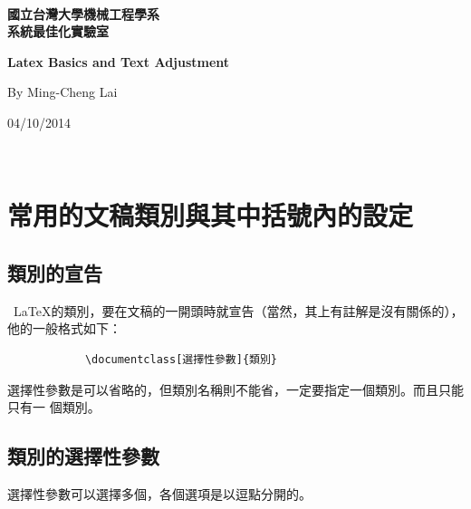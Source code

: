 \documentclass[12pt,a4paper]{report}
\begin{document}
\begin{CJK}{UTF8}{bkai}
\thispagestyle{empty}
\begin{center}
       ~\\
        \vspace{6.8cm}

        \textbf{\Huge
國立台灣大學機械工程學系 \\
系統最佳化實驗室
}
        \vspace{3cm}

        \textbf{\Huge
	Latex Basics and Text Adjustment
        }
        \vspace{6cm}

        {\large
        By  Ming-Cheng Lai
        }
        \vspace{4cm}

        {\large
            04/10/2014
        }
    \end{center}

\newpage



\thispagestyle{empty}
~
\newpage
\clearpage
\setcounter{page}{1}
\chapter{常用的文稿類別與其中括號內的設定}

\section{類別的宣告}
\noindent\  
\LaTeX 的類別，要在文稿的一開頭時就宣告（當然，其上有註解是沒有關係的），他的一般格式如下：

		\begin{framed}
			\begin{verbatim}
			\documentclass[選擇性參數]{類別}
			\end{verbatim}
		\end{framed}
	選擇性參數是可以省略的，但類別名稱則不能省，一定要指定一個類別。而且只能只有一
個類別。


\section{類別的選擇性參數}
選擇性參數可以選擇多個，各個選項是以逗點分開的。


\end{CJK}
\end{document}
